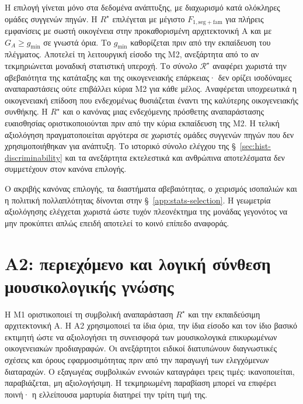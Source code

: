 \documentclass[11pt,a4paper]{article}
\begin{document}
Η επιλογή γίνεται μόνο στα δεδομένα ανάπτυξης, με διαχωρισμό κατά ολόκληρες ομάδες συγγενών πηγών. Η $R^\star$ επιλέγεται με μέγιστο $F_{1,\mathrm{seg+fam}}$ για πλήρεις εμφανίσεις με σωστή οικογένεια στην προκαθορισμένη αρχιτεκτονική A και με $G_A\ge g_{\min}$ σε γνωστά όρια. Το $g_{\min}$ καθορίζεται πριν από την εκπαίδευση του πλέγματος. Αποτελεί τη λειτουργική είσοδο της M2, ανεξάρτητα από το αν τεκμηριώνεται μοναδική στατιστική υπεροχή. Το σύνολο $\mathcal R^\star$ αναφέρει χωριστά την αβεβαιότητα της κατάταξης και της οικογενειακής επάρκειας· δεν ορίζει ισοδύναμες αναπαραστάσεις ούτε επιβάλλει κύρια M2 για κάθε μέλος. Αναφέρεται υποχρεωτικά η οικογενειακή επίδοση που ενδεχομένως θυσιάζεται έναντι της καλύτερης οικογενειακής συνθήκης. Η $R^\star$ και ο κανόνας μιας ενδεχόμενης πρόσθετης αναπαράστασης ευαισθησίας οριστικοποιούνται πριν από την κύρια εκπαίδευση της M2. Η τελική αξιολόγηση πραγματοποιείται αργότερα σε χωριστές ομάδες συγγενών πηγών που δεν χρησιμοποιήθηκαν για ανάπτυξη. Το ιστορικό σύνολο ελέγχου της §~\ref{sec:hist-discriminability} και τα ανεξάρτητα εκτελεστικά και ανθρώπινα αποτελέσματα δεν συμμετέχουν στον κανόνα επιλογής.

Ο ακριβής κανόνας επιλογής, τα διαστήματα αβεβαιότητας, ο χειρισμός ισοπαλιών και η πολιτική πολλαπλότητας δίνονται στην §~\ref{app:stats-selection}. Η γεωμετρία αξιολόγησης ελέγχεται χωριστά ώστε τυχόν πλεονέκτημα της μονάδας γεγονότος να μην προκύπτει απλώς επειδή αποτελεί το κοινό επίπεδο αναφοράς.


\section{Α2: περιεχόμενο και λογική σύνθεση μουσικολογικής γνώσης}\label{sec:a2}

Η Μ1 οριστικοποιεί τη συμβολική αναπαράσταση $R^\star$ και την εκπαιδεύσιμη αρχιτεκτονική A. Η Α2 χρησιμοποιεί τα ίδια όρια, την ίδια είσοδο και τον ίδιο βασικό εκτιμητή ώστε να αξιολογήσει τη συνεισφορά των μουσικολογικά επικυρωμένων οικογενειακών προδιαγραφών. Οι ανεξάρτητοι ειδικοί διατυπώνουν διαγνωστικές σχέσεις και όρους εφαρμοσιμότητας πριν από την παραγωγή των ελεγχόμενων διαταραχών. Ο εξαγωγέας συμβολικών εννοιών καταγράφει τρεις τιμές: ικανοποιείται, παραβιάζεται, μη αξιολογήσιμη. Η τεκμηριωμένη παραβίαση μπορεί να επιφέρει ποινή· η ελλείπουσα μαρτυρία διατηρεί την τρίτη τιμή της.
\end{document}
